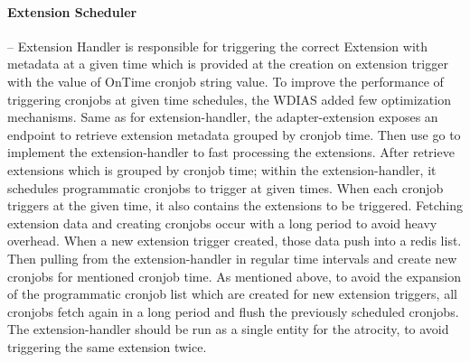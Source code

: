 \paragraph{Extension Scheduler}-- Extension Handler is responsible for triggering the correct Extension with metadata at a given time which is provided at the creation on extension trigger with the value of OnTime cronjob string value. To improve the performance of triggering cronjobs at given time schedules, the WDIAS added few optimization mechanisms.
Same as for extension-handler, the adapter-extension exposes an endpoint to retrieve extension metadata grouped by cronjob time. Then use \acrshort{go} to implement the extension-handler to fast processing the extensions. After retrieve extensions which is grouped by cronjob time; within the extension-handler, it schedules programmatic cronjobs to trigger at given times. When each cronjob triggers at the given time, it also contains the extensions to be triggered. Fetching extension data and creating cronjobs occur with a long period to avoid heavy overhead.
When a new extension trigger created, those data push into a \acrshort{redis} list. Then pulling from the extension-handler in regular time intervals and create new cronjobs for mentioned cronjob time.
As mentioned above, to avoid the expansion of the programmatic cronjob list which are created for new extension triggers, all cronjobs fetch again in a long period and flush the previously scheduled cronjobs.
The extension-handler should be run as a single entity for the atrocity, to avoid triggering the same extension twice.